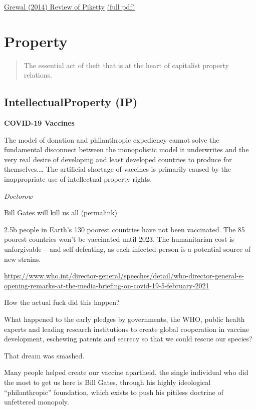 \documentclass[
]{book}
\begin{document}
\href{https://harvardlawreview.org/2014/12/the-laws-of-capitalism/}{Grewal (2014) Review of Piketty}
\href{pdf/Grewal_2014_laws_of_Capitalism.pdf}{(full pdf)}

\hypertarget{property}{%
\chapter{Property}\label{property}}

\begin{quote}
The essential act of theft that is at the heart of capitalist property relations.
\end{quote}

\hypertarget{intellectualproperty-ip}{%
\section{IntellectualProperty (IP)}\label{intellectualproperty-ip}}

\textbf{COVID-19 Vaccines}

The model of donation and philanthropic expediency cannot solve the fundamental disconnect between the monopolistic model it underwrites and the very real desire of developing and least developed countries to produce for themselves.\ldots{} The artificial shortage of vaccines is primarily caused by the inappropriate use of intellectual property rights.

\emph{Doctorow}

Bill Gates will kill us all (permalink)

2.5b people in Earth's 130 poorest countries have not been vaccinated. The 85 poorest countries won't be vaccinated until 2023. The humanitarian cost is unforgivable -- and self-defeating, as each infected person is a potential source of new strains.

\url{https://www.who.int/director-general/speeches/detail/who-director-general-s-opening-remarks-at-the-media-briefing-on-covid-19-5-february-2021}

How the actual fuck did this happen?

What happened to the early pledges by governments, the WHO, public health experts and leading research institutions to create global cooperation in vaccine development, eschewing patents and secrecy so that we could rescue our species?

That dream was smashed.

Many people helped create our vaccine apartheid, the single individual who did the most to get us here is Bill Gates, through his highly ideological ``philanthropic'' foundation, which exists to push his pitiless doctrine of unfettered monopoly.
\end{document}
